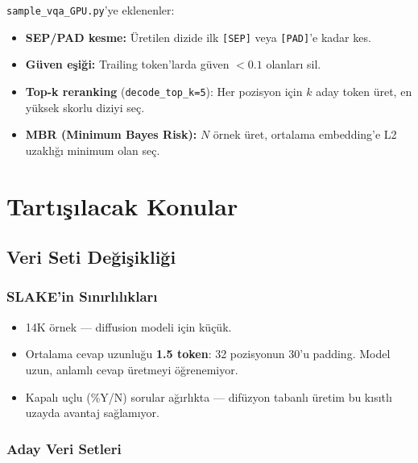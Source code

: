 \documentclass[12pt,a4paper]{article}
\begin{document}
\texttt{sample\_vqa\_GPU.py}'ye eklenenler:
\begin{itemize}
    \item \textbf{SEP/PAD kesme:} Üretilen dizide ilk \texttt{[SEP]} veya \texttt{[PAD]}'e kadar kes.
    \item \textbf{Güven eşiği:} Trailing token'larda güven $< 0.1$ olanları sil.
    \item \textbf{Top-k reranking} (\texttt{decode\_top\_k=5}): Her pozisyon için $k$ aday token üret, en yüksek skorlu diziyi seç.
    \item \textbf{MBR (Minimum Bayes Risk):} $N$ örnek üret, ortalama embedding'e L2 uzaklığı minimum olan seç.
\end{itemize}

\section{Tartışılacak Konular}

\subsection{Veri Seti Değişikliği}

\subsubsection{SLAKE'in Sınırlılıkları}

\begin{itemize}
    \item 14K örnek --- diffusion modeli için küçük.
    \item Ortalama cevap uzunluğu \textbf{1.5 token}: 32 pozisyonun 30'u padding. Model uzun, anlamlı cevap üretmeyi öğrenemiyor.
    \item Kapalı uçlu (\%Y/N) sorular ağırlıkta --- difüzyon tabanlı üretim bu kısıtlı uzayda avantaj sağlamıyor.
\end{itemize}

\subsubsection{Aday Veri Setleri}
\end{document}
